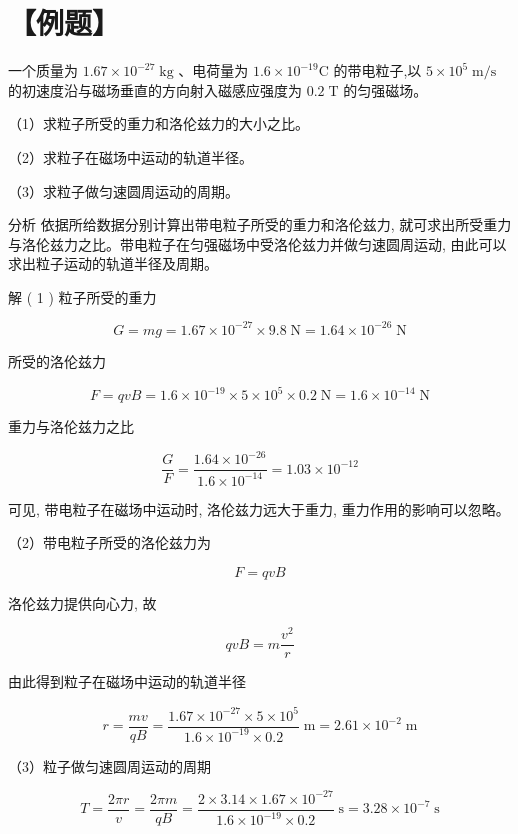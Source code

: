 \documentclass[10pt]{article}
\begin{document}
\section*{【例题】}

一个质量为 \({1.67} \times {10}^{-{27}}\mathrm{\;{kg}}\) 、电荷量为 \({1.6} \times {10}^{-{19}}\mathrm{C}\) 的带电粒子,以 \(5 \times {10}^{5}\mathrm{\;m}/\mathrm{s}\) 的初速度沿与磁场垂直的方向射入磁感应强度为 \({0.2}\mathrm{\;T}\) 的匀强磁场。

（1）求粒子所受的重力和洛伦兹力的大小之比。

（2）求粒子在磁场中运动的轨道半径。

（3）求粒子做匀速圆周运动的周期。

分析 依据所给数据分别计算出带电粒子所受的重力和洛伦兹力, 就可求出所受重力与洛伦兹力之比。带电粒子在匀强磁场中受洛伦兹力并做匀速圆周运动, 由此可以求出粒子运动的轨道半径及周期。

解 ( 1 ) 粒子所受的重力

\[
G = {mg} = {1.67} \times {10}^{-{27}} \times {9.8}\mathrm{\;N} = {1.64} \times {10}^{-{26}}\mathrm{\;N}
\]

所受的洛伦兹力

\[
F = {qvB} = {1.6} \times {10}^{-{19}} \times 5 \times {10}^{5} \times {0.2}\mathrm{\;N} = {1.6} \times {10}^{-{14}}\mathrm{\;N}
\]

重力与洛伦兹力之比

\[
\frac{G}{F} = \frac{{1.64} \times {10}^{-{26}}}{{1.6} \times {10}^{-{14}}} = {1.03} \times {10}^{-{12}}
\]

可见, 带电粒子在磁场中运动时, 洛伦兹力远大于重力, 重力作用的影响可以忽略。

（2）带电粒子所受的洛伦兹力为

\[
F = {qvB}
\]

洛伦兹力提供向心力, 故

\[
{qvB} = m\frac{{v}^{2}}{r}
\]

由此得到粒子在磁场中运动的轨道半径

\[
r = \frac{mv}{qB} = \frac{{1.67} \times {10}^{-{27}} \times 5 \times {10}^{5}}{{1.6} \times {10}^{-{19}} \times {0.2}}\mathrm{\;m} = {2.61} \times {10}^{-2}\mathrm{\;m}
\]

（3）粒子做匀速圆周运动的周期

\[
T = \frac{2\pi r}{v} = \frac{2\pi m}{qB} = \frac{2 \times {3.14} \times {1.67} \times {10}^{-{27}}}{{1.6} \times {10}^{-{19}} \times {0.2}}\mathrm{\;s} = {3.28} \times {10}^{-7}\mathrm{\;s}
\]
\end{document}
